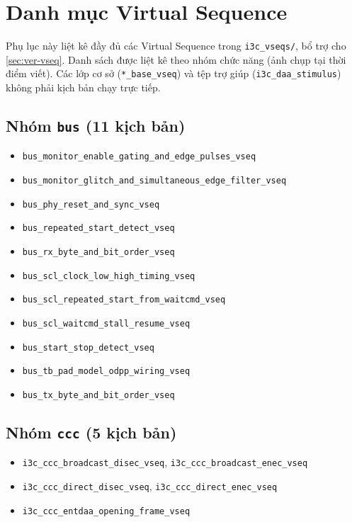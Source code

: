 \chapter{Danh mục Virtual Sequence}
\label{app:vseq}

Phụ lục này liệt kê đầy đủ các Virtual Sequence trong \texttt{i3c\_vseqs/}, bổ trợ cho \cref{sec:ver-vseq}.
Danh sách được liệt kê theo nhóm chức năng (ảnh chụp tại thời điểm viết). Các lớp cơ sở
(\texttt{*\_base\_vseq}) và tệp trợ giúp (\texttt{i3c\_daa\_stimulus}) không phải kịch bản chạy trực tiếp.

\section*{Nhóm \texttt{bus} (11 kịch bản)}
\begin{itemize}\itemsep0pt
  \item \texttt{bus\_monitor\_enable\_gating\_and\_edge\_pulses\_vseq}
  \item \texttt{bus\_monitor\_glitch\_and\_simultaneous\_edge\_filter\_vseq}
  \item \texttt{bus\_phy\_reset\_and\_sync\_vseq}
  \item \texttt{bus\_repeated\_start\_detect\_vseq}
  \item \texttt{bus\_rx\_byte\_and\_bit\_order\_vseq}
  \item \texttt{bus\_scl\_clock\_low\_high\_timing\_vseq}
  \item \texttt{bus\_scl\_repeated\_start\_from\_waitcmd\_vseq}
  \item \texttt{bus\_scl\_waitcmd\_stall\_resume\_vseq}
  \item \texttt{bus\_start\_stop\_detect\_vseq}
  \item \texttt{bus\_tb\_pad\_model\_odpp\_wiring\_vseq}
  \item \texttt{bus\_tx\_byte\_and\_bit\_order\_vseq}
\end{itemize}

\section*{Nhóm \texttt{ccc} (5 kịch bản)}
\begin{itemize}\itemsep0pt
  \item \texttt{i3c\_ccc\_broadcast\_disec\_vseq}, \texttt{i3c\_ccc\_broadcast\_enec\_vseq}
  \item \texttt{i3c\_ccc\_direct\_disec\_vseq}, \texttt{i3c\_ccc\_direct\_enec\_vseq}
  \item \texttt{i3c\_ccc\_entdaa\_opening\_frame\_vseq}
\end{itemize}


